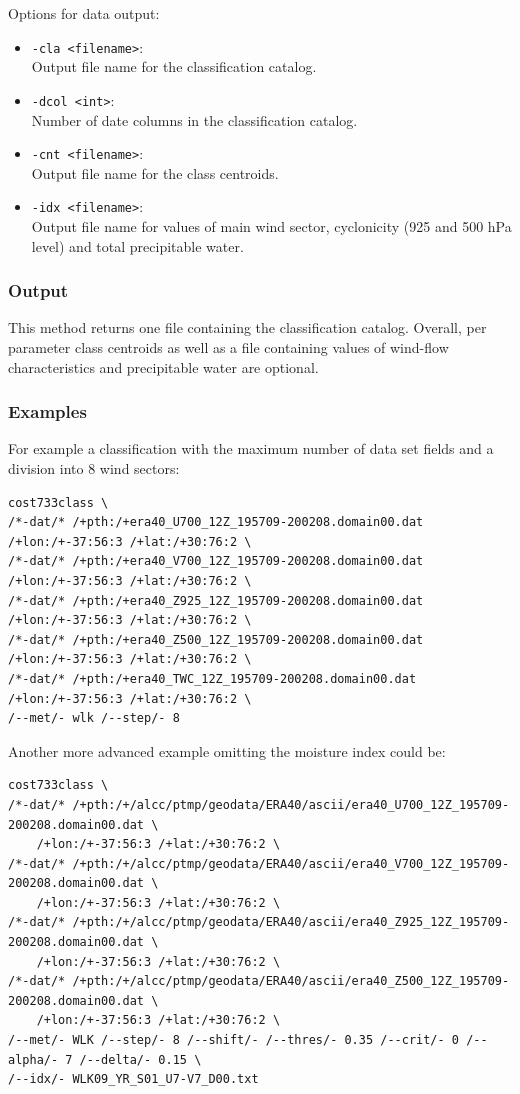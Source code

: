 \documentclass[12pt, oneside, a4paper, headsepline, plainheadsepline]{scrbook}
\begin{document}
Options for data output:
\begin{itemize}
 \item \verb+-cla <filename>+:\\ Output file name for the classification catalog.
 \item \verb+-dcol <int>+:\\ Number of date columns in the classification catalog.
 \item \verb+-cnt <filename>+:\\ Output file name for the class centroids.
 \item \verb+-idx <filename>+:\\ Output file name for values of main wind sector, cyclonicity (925 and 500 hPa level) and total precipitable water.
\end{itemize}

\subsubsection*{Output}
This method returns one file containing the classification catalog. 
Overall, per parameter class centroids as well as a file containing values of wind-flow 
characteristics and precipitable water are optional.

\subsubsection*{Examples}
For example a classification with the maximum number of data set fields and a division into 8 wind sectors:
\begin{scriptsize}
\begin{lstlisting}
cost733class \
/*-dat/* /+pth:/+era40_U700_12Z_195709-200208.domain00.dat /+lon:/+-37:56:3 /+lat:/+30:76:2 \
/*-dat/* /+pth:/+era40_V700_12Z_195709-200208.domain00.dat /+lon:/+-37:56:3 /+lat:/+30:76:2 \
/*-dat/* /+pth:/+era40_Z925_12Z_195709-200208.domain00.dat /+lon:/+-37:56:3 /+lat:/+30:76:2 \
/*-dat/* /+pth:/+era40_Z500_12Z_195709-200208.domain00.dat /+lon:/+-37:56:3 /+lat:/+30:76:2 \
/*-dat/* /+pth:/+era40_TWC_12Z_195709-200208.domain00.dat /+lon:/+-37:56:3 /+lat:/+30:76:2 \
/--met/- wlk /--step/- 8 
\end{lstlisting}
\end{scriptsize}

Another more advanced example omitting the moisture index could be:
\begin{scriptsize}
\begin{lstlisting}
cost733class \
/*-dat/* /+pth:/+/alcc/ptmp/geodata/ERA40/ascii/era40_U700_12Z_195709-200208.domain00.dat \
	/+lon:/+-37:56:3 /+lat:/+30:76:2 \
/*-dat/* /+pth:/+/alcc/ptmp/geodata/ERA40/ascii/era40_V700_12Z_195709-200208.domain00.dat \
	/+lon:/+-37:56:3 /+lat:/+30:76:2 \
/*-dat/* /+pth:/+/alcc/ptmp/geodata/ERA40/ascii/era40_Z925_12Z_195709-200208.domain00.dat \
	/+lon:/+-37:56:3 /+lat:/+30:76:2 \
/*-dat/* /+pth:/+/alcc/ptmp/geodata/ERA40/ascii/era40_Z500_12Z_195709-200208.domain00.dat \
	/+lon:/+-37:56:3 /+lat:/+30:76:2 \
/--met/- WLK /--step/- 8 /--shift/- /--thres/- 0.35 /--crit/- 0 /--alpha/- 7 /--delta/- 0.15 \
/--idx/- WLK09_YR_S01_U7-V7_D00.txt
\end{lstlisting}
\end{scriptsize}
\end{document}
